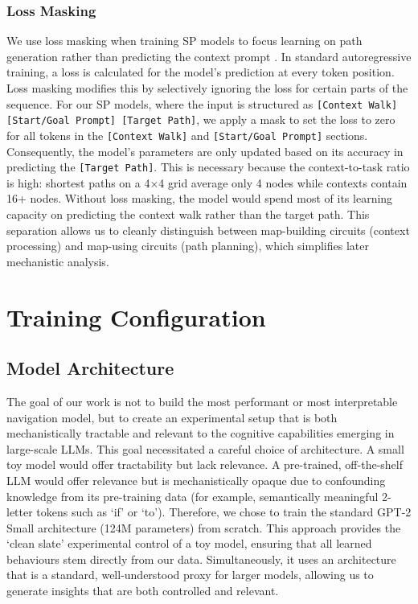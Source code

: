 \subsubsection{Loss Masking}

We use loss masking when training SP models to focus learning on path generation rather than predicting the context prompt \citep{lossmasking}. In standard autoregressive training, a loss is calculated for the model's prediction at every token position. Loss masking modifies this by selectively ignoring the loss for certain parts of the sequence. For our SP models, where the input is structured as \texttt{[Context Walk] [Start/Goal Prompt] [Target Path]}, we apply a mask to set the loss to zero for all tokens in the \texttt{[Context Walk]} and \texttt{[Start/Goal Prompt]} sections. Consequently, the model's parameters are only updated based on its accuracy in predicting the \texttt{[Target Path]}. This is necessary because the context-to-task ratio is high: shortest paths on a 4×4 grid average only 4 nodes while contexts contain 16+ nodes. Without loss masking, the model would spend most of its learning capacity on predicting the context walk rather than the target path. This separation allows us to cleanly distinguish between map-building circuits (context processing) and map-using circuits (path planning), which simplifies later mechanistic analysis.

\section{Training Configuration}

\subsection{Model Architecture}

The goal of our work is not to build the most performant or most interpretable navigation model, but to create an experimental setup that is both mechanistically tractable and relevant to the cognitive capabilities emerging in large-scale LLMs. This goal necessitated a careful choice of architecture. A small toy model would offer tractability but lack relevance. A pre-trained, off-the-shelf LLM would offer relevance but is mechanistically opaque due to confounding knowledge from its pre-training data (for example, semantically meaningful 2-letter tokens such as `if' or `to'). Therefore, we chose to train the standard GPT-2 Small architecture (124M parameters) from scratch. This approach provides the `clean slate' experimental control of a toy model, ensuring that all learned behaviours stem directly from our data. Simultaneously, it uses an architecture that is a standard, well-understood proxy for larger models, allowing us to generate insights that are both controlled and relevant.

